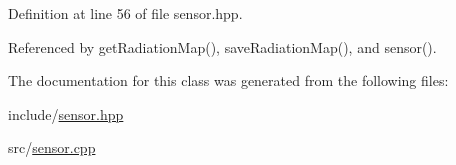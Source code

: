 Definition at line 56 of file sensor.\+hpp.



Referenced by get\+Radiation\+Map(), save\+Radiation\+Map(), and sensor().



The documentation for this class was generated from the following files\+:\begin{DoxyCompactItemize}
\item 
include/\hyperlink{sensor_8hpp}{sensor.\+hpp}\item 
src/\hyperlink{sensor_8cpp}{sensor.\+cpp}\end{DoxyCompactItemize}
